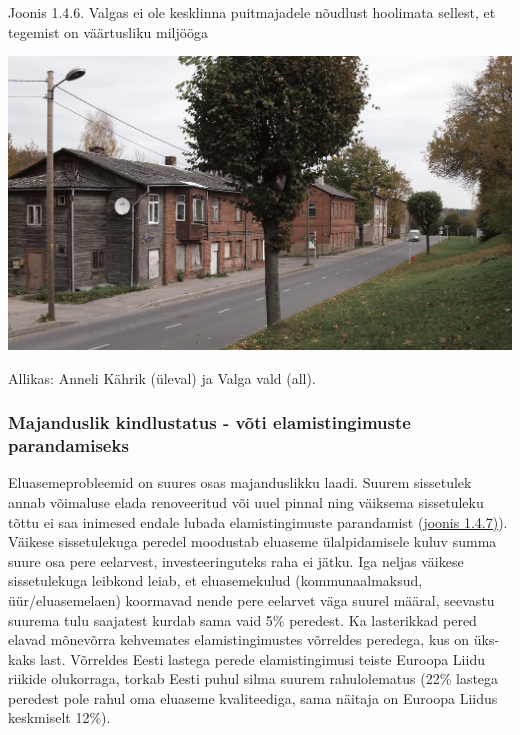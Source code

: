 \documentclass[estonian,]{article}
\begin{document}
{Joonis 1.4.6.} Valgas ei ole kesklinna puitmajadele nõudlust hoolimata sellest, et tegemist on väärtusliku miljööga

\begin{center}\includegraphics[width=1\linewidth]{figures/1-chapter/fig146} \end{center}

\begin{imgsource}
{Allikas:} Anneli Kährik (üleval) ja Valga vald (all).
\end{imgsource}

\hypertarget{majanduslik-kindlustatus---vuxf5ti-elamistingimuste-parandamiseks}{%
\subsubsection*{Majanduslik kindlustatus - võti elamistingimuste parandamiseks}\label{majanduslik-kindlustatus---vuxf5ti-elamistingimuste-parandamiseks}}

Eluasemeprobleemid on suures osas majanduslikku laadi. Suurem sissetulek annab võimaluse elada renoveeritud või uuel pinnal ning väiksema sissetuleku tõttu ei saa inimesed endale lubada elamistingimuste parandamist (\protect\hyperlink{figure147}{joonis 1.4.7)}). Väikese sissetulekuga peredel moodustab eluaseme ülalpidamisele kuluv summa suure osa pere eelarvest, investeeringuteks raha ei jätku. Iga neljas väikese sissetulekuga leibkond leiab, et eluasemekulud (kommunaalmaksud, üür/eluasemelaen) koormavad nende pere eelarvet väga suurel määral, seevastu suurema tulu saajatest kurdab sama vaid 5\% peredest. Ka lasterikkad pered elavad mõnevõrra kehvemates elamistingimustes võrreldes peredega, kus on üks-kaks last. Võrreldes Eesti lastega perede elamistingimusi teiste Euroopa Liidu riikide olukorraga, torkab Eesti puhul silma suurem rahulolematus (22\% lastega peredest pole rahul oma eluaseme kvaliteediga, sama näitaja on Euroopa Liidus keskmiselt 12\%).
\end{document}
